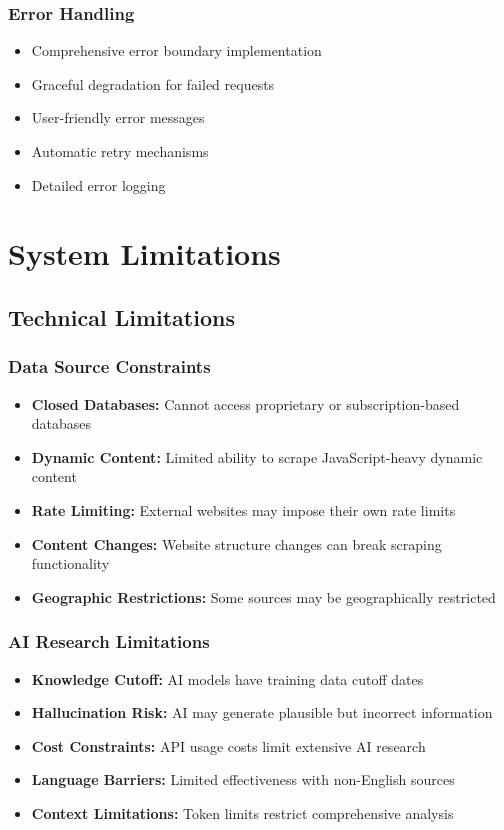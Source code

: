 \documentclass[12pt,a4paper]{article}
\begin{document}
\subsubsection{Error Handling}
\begin{itemize}
    \item Comprehensive error boundary implementation
    \item Graceful degradation for failed requests
    \item User-friendly error messages
    \item Automatic retry mechanisms
    \item Detailed error logging
\end{itemize}

\section{System Limitations}

\subsection{Technical Limitations}

\subsubsection{Data Source Constraints}
\begin{itemize}
    \item \textbf{Closed Databases:} Cannot access proprietary or subscription-based databases
    \item \textbf{Dynamic Content:} Limited ability to scrape JavaScript-heavy dynamic content
    \item \textbf{Rate Limiting:} External websites may impose their own rate limits
    \item \textbf{Content Changes:} Website structure changes can break scraping functionality
    \item \textbf{Geographic Restrictions:} Some sources may be geographically restricted
\end{itemize}

\subsubsection{AI Research Limitations}
\begin{itemize}
    \item \textbf{Knowledge Cutoff:} AI models have training data cutoff dates
    \item \textbf{Hallucination Risk:} AI may generate plausible but incorrect information
    \item \textbf{Cost Constraints:} API usage costs limit extensive AI research
    \item \textbf{Language Barriers:} Limited effectiveness with non-English sources
    \item \textbf{Context Limitations:} Token limits restrict comprehensive analysis
\end{itemize}
\end{document}
